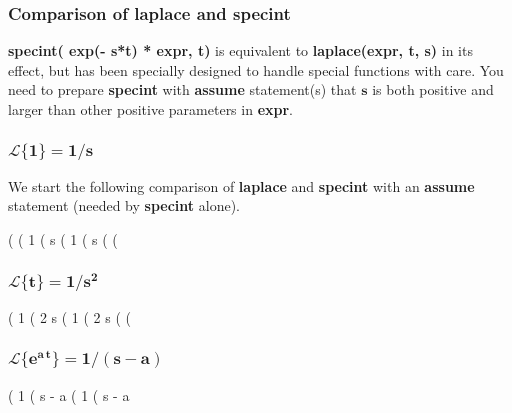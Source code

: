 \documentclass[12pt]{article}
\begin{document}
\subsubsection{Comparison of \textbf{laplace} and \textbf{specint} }  
\textbf{specint( exp(- s*t) * expr, t)} is equivalent to
  \textbf{laplace(expr, t, s)}
  in its effect, but has been specially designed to handle special functions with care.
You need to prepare \textbf{specint} with \textbf{assume} statement(s) that $\mathbf{s}$ is
  both positive and larger than other positive parameters in \textbf{expr}.
\subsubsection*{$\mathbf{\mathcal{L} \{1\} = 1/s}$}
We start the following comparison of \textbf{laplace} and \textbf{specint} with an
  \textbf{assume} statement (needed by \textbf{specint} alone).
\begin{myVerbatim}
(%
(%
                                       1
(%
                                       s
(%
                                       1
(%
                                       s
(%
(%
\end{myVerbatim}
\subsubsection*{$\mathbf{\mathcal{L} \{t\} = 1/s^{2}}$}
\begin{myVerbatim}
(%
                                      1
(%
                                       2
                                      s
(%
                                      1
(%
                                       2
                                      s
(%
(%
\end{myVerbatim}
\subsubsection*{$\mathbf{\mathcal{L} \{e^{a\,t}\} = 1/(s-a) }$}
\begin{myVerbatim}
(%
                                       1
(%
                                     s - a
(%
                                       1
(%
                                     s - a
\end{myVerbatim}
\end{document}
